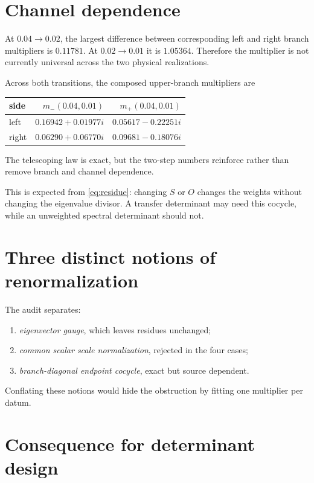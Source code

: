 \documentclass[12pt]{article}
\theoremstyle{remark}\newtheorem{remark}[theorem]{Remark}
\begin{document}
\section{Channel dependence}

At $0.04\to0.02$, the largest difference between corresponding left and
right branch multipliers is $0.11781$.  At $0.02\to0.01$ it is $1.05364$.
Therefore the multiplier is not currently universal across the two
physical realizations.

Across both transitions, the composed upper-branch multipliers are
\begin{center}
\begin{tabular}{lrr}
\toprule
side & $m_-(0.04,0.01)$ & $m_+(0.04,0.01)$\\
\midrule
left  & $0.16942+0.01977i$ & $0.05617-0.22251i$\\
right & $0.06290+0.06770i$ & $0.09681-0.18076i$\\
\bottomrule
\end{tabular}
\end{center}
The telescoping law is exact, but the two-step numbers reinforce rather than
remove branch and channel dependence.

This is expected from \eqref{eq:residue}: changing $S$ or $O$ changes the
weights without changing the eigenvalue divisor.  A transfer determinant
may need this cocycle, while an unweighted spectral determinant should not.

\section{Three distinct notions of renormalization}

The audit separates:
\begin{enumerate}[leftmargin=2em]
\item \emph{eigenvector gauge}, which leaves residues unchanged;
\item \emph{common scalar scale normalization}, rejected in the four cases;
\item \emph{branch-diagonal endpoint cocycle}, exact but source dependent.
\end{enumerate}
Conflating these notions would hide the obstruction by fitting one multiplier
per datum.

\section{Consequence for determinant design}
\end{document}
